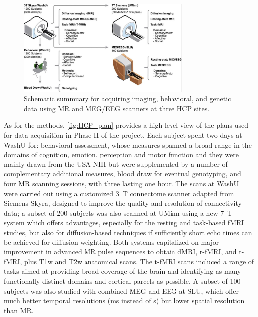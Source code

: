 \begin{figure}[htbp]
    \centering
    \includegraphics[width = 0.75\textwidth]{assets/images/HCP_plan.png}
    \caption{Schematic summuary for acquiring imaging, behavioral, and genetic data using \gls{MR} and \gls{MEG}/\gls{EEG} scanners at three \gls{HCP} sites.}
    \label{fig:HCP_plan}
\end{figure}

As for the methods, \autoref{fig:HCP_plan} provides a high-level view of the plans used for data acquisition in Phase II of the project. Each subject spent two days at \gls{WashU} for: behavioral assessment, whose measures spanned a broad range in the domains of cognition, emotion, perception and motor function and they were mainly drawn from the \gls{USA} \gls{NIH} but were supplemented by a number of complementary additional measures, blood draw for eventual genotyping, and four \gls{MR} scanning sessions, with three lasting one hour. The scans at \gls{WashU} were carried out using a customized \SI{3}{\tesla} connectome scanner adapted from Siemens Skyra, designed to improve the quality and resolution of connectivity data; a subset of 200 subjects was also scanned at \gls{UMinn} using a new \SI{7}{\tesla} system which offers advantages, especially for the resting and task-based fMRI studies, but also for diffusion-based techniques if sufficiently short echo times can be achieved for diffusion weighting. Both systems capitalized on major improvement in advanced \gls{MR} pulse sequences to obtain \gls{dMRI}, \gls{r-fMRI}, and \gls{t-fMRI}, plus \gls{T1w} and \gls{T2w} anatomical scans. The \gls{t-fMRI} scans incluced a range of tasks aimed at providing broad coverage of the brain and identifying as many functionally distinct domains and cortical parcels as possible. A subset of 100 subjects was also studied with combined \gls{MEG} and \gls{EEG} at \gls{SLU}, which offer much better temporal resolutions (\si{\milli\second} instead of \si{\second}) but lower spatial resolution than \gls{MR}. 

